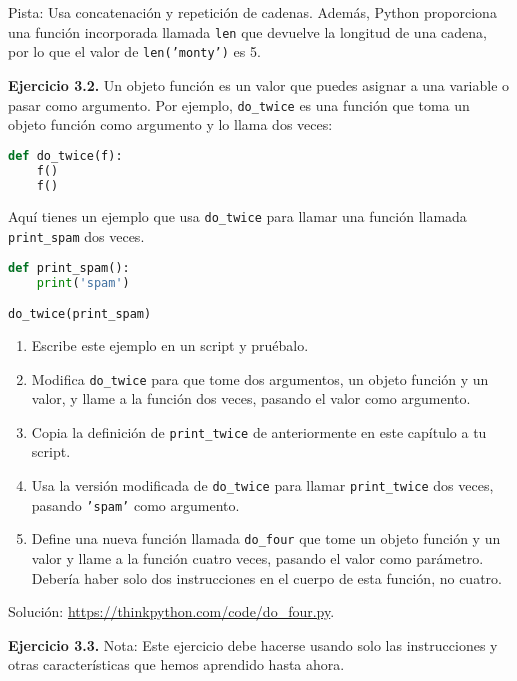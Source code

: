 \documentclass[12pt,letterpaper]{book}
\begin{document}
Pista: Usa concatenación y repetición de cadenas. Además, Python proporciona una función incorporada llamada \texttt{len} que devuelve la longitud de una cadena, por lo que el valor de \texttt{len('monty')} es 5.

\textbf{Ejercicio 3.2.} Un objeto función es un valor que puedes asignar a una variable o pasar como argumento. Por ejemplo, \texttt{do\_twice} es una función que toma un objeto función como argumento y lo llama dos veces:

\begin{lstlisting}[language=Python]
def do_twice(f):
    f()
    f()
\end{lstlisting}

Aquí tienes un ejemplo que usa \texttt{do\_twice} para llamar una función llamada \texttt{print\_spam} dos veces.

\begin{lstlisting}[language=Python]
def print_spam():
    print('spam')

do_twice(print_spam)
\end{lstlisting}

\begin{enumerate}
\item Escribe este ejemplo en un script y pruébalo.

\item Modifica \texttt{do\_twice} para que tome dos argumentos, un objeto función y un valor, y llame a la función dos veces, pasando el valor como argumento.

\item Copia la definición de \texttt{print\_twice} de anteriormente en este capítulo a tu script.

\item Usa la versión modificada de \texttt{do\_twice} para llamar \texttt{print\_twice} dos veces, pasando \texttt{'spam'} como argumento.

\item Define una nueva función llamada \texttt{do\_four} que tome un objeto función y un valor y llame a la función cuatro veces, pasando el valor como parámetro. Debería haber solo dos instrucciones en el cuerpo de esta función, no cuatro.
\end{enumerate}

Solución: \href{https://thinkpython.com/code/do\_four.py}{https://thinkpython.com/code/do\_four.py}.

\textbf{Ejercicio 3.3.} Nota: Este ejercicio debe hacerse usando solo las instrucciones y otras características que hemos aprendido hasta ahora.
\end{document}
